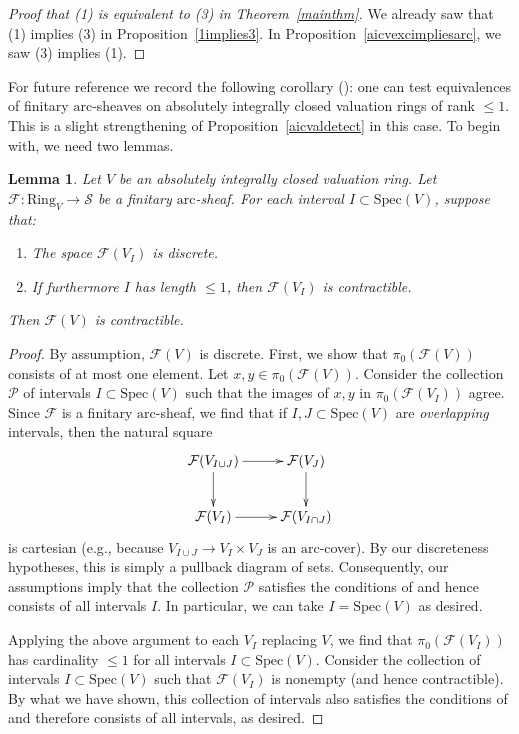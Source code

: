 \documentclass[reqno]{amsart}
\newcommand{\sF}{\mathcal{F}}
\newcommand{\spec}{\mathrm{Spec}}
\newcommand{\arc}{\mathrm{arc}}
\newtheorem{lemma}[theorem]{Lemma}
\theoremstyle{definition}
\begin{document}
\begin{proof}[{Proof that (1) is equivalent to (3) in Theorem~\ref{mainthm}}] 
We already saw that (1) implies (3) in 
Proposition~\ref{1implies3}.
In Proposition~\ref{aicvexcimpliesarc}, we saw (3) implies (1). 
\end{proof} 

For future reference we record the following corollary
(): one can test
equivalences of finitary $\arc$-sheaves on absolutely integrally closed valuation rings of rank $\leq
1$. 
This is a slight strengthening of Proposition~\ref{aicvaldetect} in this
case. To begin with, we need two lemmas. 

\begin{lemma} 
Let $V$ be an absolutely integrally closed valuation ring. 
Let $\sF \colon \mathrm{Ring}_V \to \mathcal{S}$ be a finitary $\arc$-sheaf. 
For each interval $I \subset \spec(V)$, suppose that: 
\begin{enumerate}
\item  The space $\sF(V_I)$ is discrete. 
\item If furthermore $I$ has length $\leq 1$, then 
$\sF(V_I)$ is contractible. 
\end{enumerate}
Then $\sF(V)$ is contractible. 
\label{xequalsy}
\end{lemma} 
\begin{proof} 
By assumption, $\sF(V)$ is discrete. 
First, we show that $\pi_0(\sF(V))$ consists of at most one element. 
Let $x, y \in \pi_0(\sF(V))$. 
Consider the collection $\mathcal{P}$ of intervals $I \subset \spec(V)$ such that the images of $x,y $ in
$\pi_0( \sF(V_I))$ agree. 
Since $\sF$ is a finitary $\arc$-sheaf, we find that if $I, J \subset \spec(V)$
are \emph{overlapping} intervals, then the natural square
\[ \xymatrix{
\sF(V_{I \cup J}) \ar[d]  \ar[r] &  \sF(V_J) \ar[d]  \\
\sF(V_I) \ar[r] &  \sF(V_{I \cap J})
}\]
is cartesian (e.g., because $V_{I \cup J} \to V_I \times V_J$ is an
$\arc$-cover). 
By our discreteness hypotheses, this is simply a pullback diagram of sets. 
Consequently, our assumptions imply that the collection $\mathcal{P}$
satisfies the conditions of
 and hence consists of all intervals
$I$. In particular, we can take $I = \spec(V)$ as desired. 

Applying the above argument to each $V_I$ replacing $V$, we find that 
$\pi_0(\sF(V_I))$
has cardinality $\leq 1$ for all intervals $I \subset \spec(V)$. 
Consider the collection of intervals $I \subset \spec(V)$ such that
$\sF(V_I)$ is nonempty (and hence contractible). 
By what we have shown, 
this collection of intervals also satisfies the conditions of
 and therefore consists of all intervals, as desired. 
\end{proof} 
\end{document}

